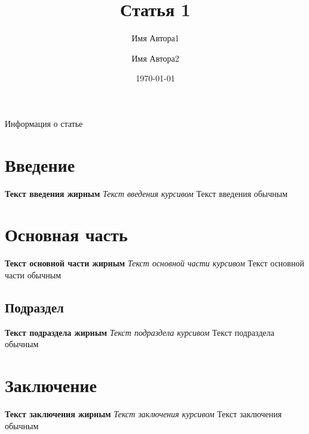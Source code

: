 \documentclass[14pt]{article}
\title{Статья 1}
\author{Имя Автора1 \and Имя Автора2}
\date{\today}
\begin{document}
\maketitle

\begin{center}
    {\huge Информация о статье}
\end{center}
\hfill \break
\renewcommand{\contentsname}{Содержание}
\tableofcontents
\thispagestyle{empty}

\newpage
\section{Введение}
\small{\textbf{Текст введения жирным} \textit{Текст введения курсивом} Текст введения обычным}

\section{Основная часть}
\large{\textbf{Текст основной части жирным} \textit{Текст основной части курсивом} Текст основной части обычным}

\subsection{Подраздел}
\large{\textbf{Текст подраздела жирным} \textit{Текст подраздела курсивом} Текст подраздела обычным}

\section{Заключение}
\huge{\textbf{Текст заключения жирным} \textit{Текст заключения курсивом} Текст заключения обычным}
\end{document}
